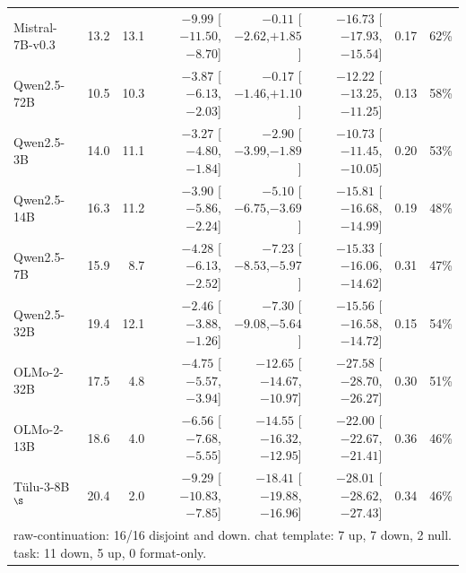 \begin{table}[t]
\begin{tabular}{l r r r r r r r}
Mistral-7B-v0.3 & 13.2 & 13.1 & $-9.99$ {\scriptsize[$-11.50$,$-8.70$]} & $-0.11$ {\scriptsize[$-2.62$,$+1.85$]} & $-16.73$ {\scriptsize[$-17.93$,$-15.54$]} & 0.17 & 62\% \\
Qwen2.5-72B & 10.5 & 10.3 & $-3.87$ {\scriptsize[$-6.13$,$-2.03$]} & $-0.17$ {\scriptsize[$-1.46$,$+1.10$]} & $-12.22$ {\scriptsize[$-13.25$,$-11.25$]} & 0.13 & 58\% \\
Qwen2.5-3B & 14.0 & 11.1 & $-3.27$ {\scriptsize[$-4.80$,$-1.84$]} & $-2.90$ {\scriptsize[$-3.99$,$-1.89$]} & $-10.73$ {\scriptsize[$-11.45$,$-10.05$]} & 0.20 & 53\% \\
Qwen2.5-14B & 16.3 & 11.2 & $-3.90$ {\scriptsize[$-5.86$,$-2.24$]} & $-5.10$ {\scriptsize[$-6.75$,$-3.69$]} & $-15.81$ {\scriptsize[$-16.68$,$-14.99$]} & 0.19 & 48\% \\
Qwen2.5-7B & 15.9 & 8.7 & $-4.28$ {\scriptsize[$-6.13$,$-2.52$]} & $-7.23$ {\scriptsize[$-8.53$,$-5.97$]} & $-15.33$ {\scriptsize[$-16.06$,$-14.62$]} & 0.31 & 47\% \\
Qwen2.5-32B & 19.4 & 12.1 & $-2.46$ {\scriptsize[$-3.88$,$-1.26$]} & $-7.30$ {\scriptsize[$-9.08$,$-5.64$]} & $-15.56$ {\scriptsize[$-16.58$,$-14.72$]} & 0.15 & 54\% \\
OLMo-2-32B & 17.5 & 4.8 & $-4.75$ {\scriptsize[$-5.57$,$-3.94$]} & $-12.65$ {\scriptsize[$-14.67$,$-10.97$]} & $-27.58$ {\scriptsize[$-28.70$,$-26.27$]} & 0.30 & 51\% \\
OLMo-2-13B & 18.6 & 4.0 & $-6.56$ {\scriptsize[$-7.68$,$-5.55$]} & $-14.55$ {\scriptsize[$-16.32$,$-12.95$]} & $-22.00$ {\scriptsize[$-22.67$,$-21.41$]} & 0.36 & 46\% \\
T\"ulu-3-8B$^{\S}$ & 20.4 & 2.0 & $-9.29$ {\scriptsize[$-10.83$,$-7.85$]} & $-18.41$ {\scriptsize[$-19.88$,$-16.96$]} & $-28.01$ {\scriptsize[$-28.62$,$-27.43$]} & 0.34 & 46\% \\
\midrule
\multicolumn{8}{l}{\footnotesize raw-continuation: 16/16 disjoint and down. chat template: 7 up, 7 down, 2 null. task: 11 down, 5 up, 0 format-only.} \\
\bottomrule
\end{tabular}
\end{table}
